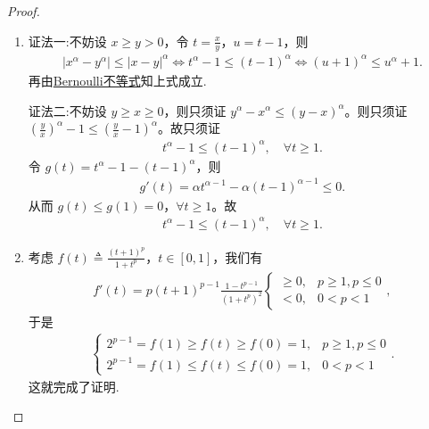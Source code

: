 \documentclass[../../main.tex]{subfiles}%
\begin{document}
\begin{proof}
\begin{enumerate}[(1)]
\item {\color{blue}证法一:}不妨设 $x\geqslant y>0$，令 $t=\frac{x}{y}$，$u=t-1$，则
\begin{align*}
\left| x^{\alpha}-y^{\alpha} \right|\leqslant \left| x-y \right|^{\alpha}
\Longleftrightarrow t^{\alpha}-1\leqslant \left( t-1 \right)^{\alpha}
\Longleftrightarrow \left( u+1 \right)^{\alpha}\leqslant u^{\alpha}+1.
\end{align*}
再由\hyperref[theorem:Bernoulli不等式]{Bernoulli不等式}知上式成立.

{\color{blue}证法二:}不妨设 $y \geqslant x \geqslant 0$，则只须证 $y^{\alpha} - x^{\alpha} \leqslant \left( y - x \right)^{\alpha}$。则只须证 $\left( \frac{y}{x} \right)^{\alpha} - 1 \leqslant \left( \frac{y}{x} - 1 \right)^{\alpha}$。故只须证
\begin{align*}
t^{\alpha} - 1 \leqslant \left( t - 1 \right)^{\alpha},\quad \forall t \geqslant 1.
\end{align*}
令 $g\left( t \right) = t^{\alpha} - 1 - \left( t - 1 \right)^{\alpha}$，则
\begin{align*}
g'\left( t \right) = \alpha t^{\alpha - 1} - \alpha \left( t - 1 \right)^{\alpha - 1} \leqslant 0.
\end{align*}
从而 $g\left( t \right) \leqslant g\left( 1 \right) = 0$，$\forall t \geqslant 1$。故
\begin{align*}
t^{\alpha} - 1 \leqslant \left( t - 1 \right)^{\alpha},\quad \forall t \geqslant 1.
\end{align*}

\item 考虑 $f(t)\triangleq\frac{(t + 1)^p}{1 + t^p}$，$t\in[0,1]$，我们有
\begin{align*}
f'(t)=p(t + 1)^{p - 1}\frac{1 - t^{p - 1}}{(1 + t^p)^2}
\begin{cases}
\geqslant0,& p\geqslant1,p\leqslant0\\
<0,& 0 < p < 1
\end{cases},
\end{align*}
于是
\begin{align*}
\begin{cases}
2^{p - 1}=f(1)\geqslant f(t)\geqslant f(0)=1,& p\geqslant1,p\leqslant0\\
2^{p - 1}=f(1)\leqslant f(t)\leqslant f(0)=1,& 0 < p < 1
\end{cases}.
\end{align*}
这就完成了证明.


\end{enumerate}
\end{proof}
\end{document}
